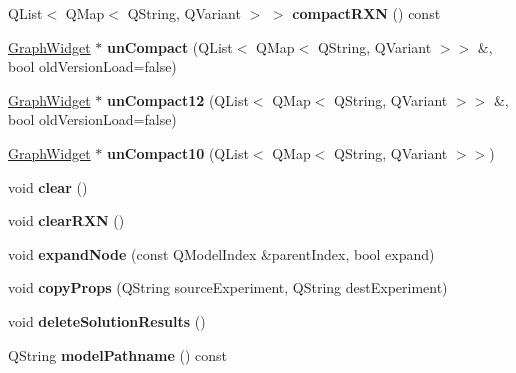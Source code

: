 \begin{DoxyCompactItemize}
Q\+List$<$ Q\+Map$<$ Q\+String, Q\+Variant $>$ $>$ {\bfseries compact\+R\+XN} () const
\item 
\mbox{\label{class_graph_widget_a8c011147faa4f1174011e23190b742c6}} 
\hyperlink{class_graph_widget}{Graph\+Widget} $\ast$ {\bfseries un\+Compact} (Q\+List$<$ Q\+Map$<$ Q\+String, Q\+Variant $>$$>$ \&, bool old\+Version\+Load=false)
\item 
\mbox{\label{class_graph_widget_a00777e623cbdede802e53e0edc1290e3}} 
\hyperlink{class_graph_widget}{Graph\+Widget} $\ast$ {\bfseries un\+Compact12} (Q\+List$<$ Q\+Map$<$ Q\+String, Q\+Variant $>$$>$ \&, bool old\+Version\+Load=false)
\item 
\mbox{\label{class_graph_widget_a58b1fd7f37e56294baece09cf400fb4c}} 
\hyperlink{class_graph_widget}{Graph\+Widget} $\ast$ {\bfseries un\+Compact10} (Q\+List$<$ Q\+Map$<$ Q\+String, Q\+Variant $>$$>$)
\item 
\mbox{\label{class_graph_widget_a0d4f7499ffd070e417ea31bfca508560}} 
void {\bfseries clear} ()
\item 
\mbox{\label{class_graph_widget_ae1e67dfe15be48730df36070cdd0a6c7}} 
void {\bfseries clear\+R\+XN} ()
\item 
\mbox{\label{class_graph_widget_aa42a639144731c671a73c6525a2e023e}} 
void {\bfseries expand\+Node} (const Q\+Model\+Index \&parent\+Index, bool expand)
\item 
\mbox{\label{class_graph_widget_a4c5fd66b82e26f3363c6f5139294b674}} 
void {\bfseries copy\+Props} (Q\+String source\+Experiment, Q\+String dest\+Experiment)
\item 
\mbox{\label{class_graph_widget_aa07e70f46795397af51f8b81096b1aa5}} 
void {\bfseries delete\+Solution\+Results} ()
\item 
\mbox{\label{class_graph_widget_af939589ae965f6e3e276ff9e18dcf411}} 
Q\+String {\bfseries model\+Pathname} () const
\item 
\mbox{\label{class_graph_widget_a7f3ab74c08061ed51173a18f30b675b0}} 
$$
\end{DoxyCompactItemize}
